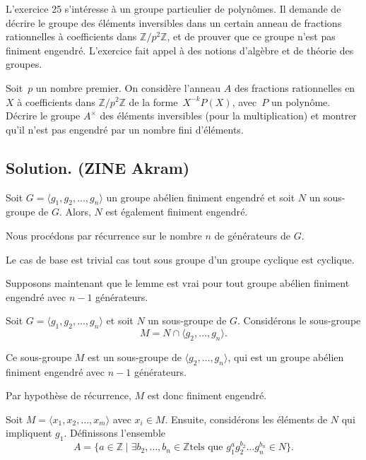 L'exercice 25 s'int{\'e}resse {\`a} un groupe particulier de polyn{\^o}mes. Il
demande de d{\'e}crire le groupe des {\'e}l{\'e}ments inversibles dans un
certain anneau de fractions rationnelles {\`a} coefficients dans $\mathbb{Z}/
p^2 \mathbb{Z}$, et de prouver que ce groupe n'est pas finiment engendr{\'e}.
L'exercice fait appel {\`a} des notions d'alg{\`e}bre et de th{\'e}orie des
groupes.
\begin{exercise}
Soit~$p$ un nombre premier. On consid{\`e}re l'anneau $A$ des fractions
rationnelles en $X$ {\`a} coefficients dans $\mathbb{Z}/ p^2 \mathbb{Z}$ de la
forme~$X^{- k} P (X)$, avec~$P$ un polyn{\^o}me. D{\'e}crire le groupe
$A^{\times}$ des {\'e}l{\'e}ments inversibles (pour la multiplication) et
montrer qu'il n'est pas engendr{\'e} par un nombre fini d'{\'e}l{\'e}ments.

\end{exercise}

\subsection*{Solution. (ZINE Akram)}



Soit $G = \langle g_1, g_2, \ldots, g_n \rangle$ un groupe ab{\'e}lien
finiment engendr{\'e} et soit $N$ un sous-groupe de $G$. Alors, $N$ est
{\'e}galement finiment engendr{\'e}.


Nous proc{\'e}dons par r{\'e}currence sur le nombre $n$ de g{\'e}n{\'e}rateurs
de $G$.

Le cas de base est trivial cas tout sous groupe d'un groupe cyclique est
cyclique.

Supposons maintenant que le lemme est vrai pour tout groupe ab{\'e}lien
finiment engendr{\'e} avec $n - 1$ g{\'e}n{\'e}rateurs.

Soit $G = \langle g_1, g_2, \ldots, g_n \rangle$ et soit $N$ un sous-groupe
de $G$. Consid{\'e}rons le sous-groupe
\[ M = N \cap \langle g_2, \ldots, g_n \rangle . \]


Ce sous-groupe $M$ est un sous-groupe de $\langle g_2, \ldots, g_n \rangle$,
qui est un groupe ab{\'e}lien finiment engendr{\'e} avec $n - 1$
g{\'e}n{\'e}rateurs.

Par hypoth{\`e}se de r{\'e}currence, $M$ est donc finiment engendr{\'e}.

Soit $M = \langle x_1, x_2, \ldots, x_m \rangle$ avec $x_i \in M$. Ensuite,
consid{\'e}rons les {\'e}l{\'e}ments de $N$ qui impliquent $g_1$.
D{\'e}finissons l'ensemble
\[ A =\{a \in \mathbb{Z} \mid \exists b_2, \ldots, b_n \in \mathbb{Z}
   \text{tels que } g_1^a g_2^{b_2} \ldots g_n^{b_n} \in N\}. \]


